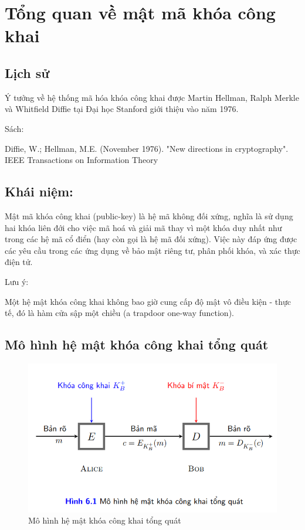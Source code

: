 \documentclass{article}
\begin{document}
\section{Tổng quan về mật mã khóa công khai}
\subsection{Lịch sử}
Ý tưởng về hệ thống mã hóa khóa công khai được Martin Hellman, Ralph Merkle và Whitfield Diffie tại Đại học Stanford giới thiệu vào năm 1976.

Sách:

Diffie, W.; Hellman, M.E. (November 1976). "New directions in cryptography". IEEE Transactions on Information Theory

\subsection{Khái niệm:}

Mật mã khóa công khai (public-key) là hệ mã không đối xứng, nghĩa là sử dụng hai khóa liên đới cho việc mã hoá và giải mã thay vì một khóa duy nhất như trong các hệ mã cổ điển (hay còn gọi là hệ mã đối xứng). Việc này đáp ứng được các yêu cầu trong các ứng dụng về bảo mật riêng tư, phân phối khóa, và xác thực điện tử.

Lưu ý:

Một hệ mật khóa công khai không bao giờ cung cấp độ mật vô điều kiện - thực tế, đó là hàm cửa sập một chiều (a trapdoor one-way function).

\subsection{Mô hình hệ mật khóa công khai tổng quát}

\begin{figure}[H]
\centering
\includegraphics[scale = 0.5]{pictures/public.png}
\caption{Mô hình hệ mật khóa công khai tổng quát}
\end{figure}
\end{document}
